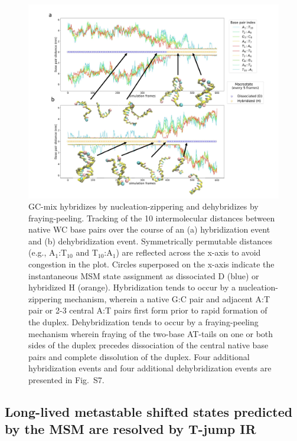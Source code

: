 \documentclass[journal=jpcbfk,manuscript=article]{achemso}
\newcommand*{\blauw}[1]{{#1}}
\begin{document}
\begin{figure}[ht!]
	\begin{center}
	\includegraphics[width=180mm, scale=1]{Fig4.pdf}
        \caption{GC-mix hybridizes by nucleation-zippering and dehybridizes by fraying-peeling. Tracking of the 10 intermolecular distances between native WC base pairs over the course of an (a) hybridization event and (b) dehybridization event. Symmetrically permutable distances (e.g., A$_1$:T$_{10}$ and T$_{10}$:A$_1$) are reflected across the x-axis to avoid congestion in the plot. Circles superposed on the x-axis indicate the instantaneous MSM state assignment as dissociated D (blue) or hybridized H (orange). Hybridization tends to occur by a nucleation-zippering mechanism, wherein a native G:C pair and adjacent A:T pair or 2-3 central A:T pairs first form prior to rapid formation of the duplex. Dehybridization tends to occur by a fraying-peeling mechanism wherein fraying of the two-base AT-tails on one or both sides of the duplex precedes dissociation of the central native base pairs and complete dissolution of the duplex. Four additional hybridization events and four additional dehybridization events are presented in \blauw{Fig.~S7}.
        }
        \label{fig:GC-mix_transitions}
	\end{center}
\end{figure}





\subsection{\label{sec:stretch_comparison}Long-lived metastable shifted states predicted by the MSM are resolved by T-jump IR}
\end{document}
